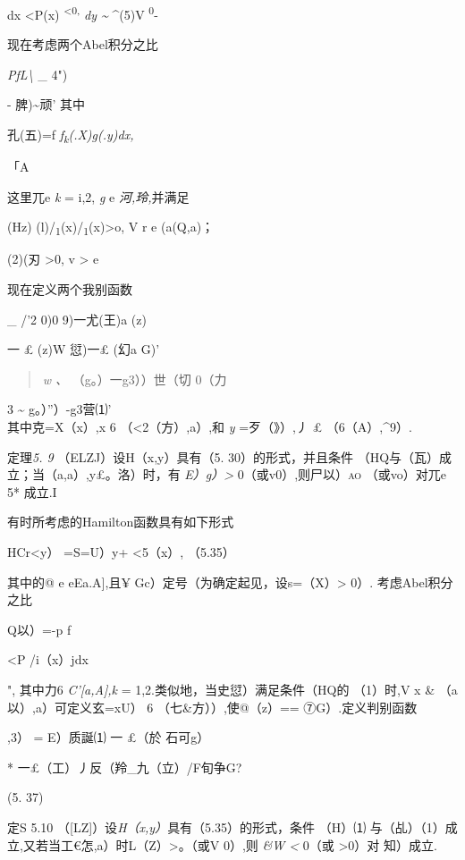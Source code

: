 \documentclass{article}
\begin{document}
dx \textless{}P(x) \textsuperscript{\textless{}0,} \emph{dy
\textasciitilde{}} \^{}(5)V \textsuperscript{0}-

现在考虑两个Abel积分之比

\emph{PfL\textbackslash{}} \_ {4")}

- 脾)\textasciitilde{}顽' 其中

孔(五)=f \emph{f\textsubscript{k}(.X)g(.y)dx,}

「A

这里兀e \emph{k} = i,2, \emph{g} e \emph{河,玲,}并满足

(Hz) (l)/\textsubscript{1}(x)/\textsubscript{1}(x)\textgreater{}o, V r e
(a(Q,a)；

(2)(刃 \textgreater{}0, v \textgreater{} e

现在定义两个我别函数

\_ {/'2 0)0 9)一尤(王)a (z)}

一 £ (z)W 愆)一£ (幻a G)'

\begin{quote}
\emph{w 、} {（g。）一g3））世（切 0（力}
\end{quote}

3 \textasciitilde{} g。）''）-g3营⑴'\\
其中克=X（x）,x 6 （\textless{}2（方）,a）,和 \emph{y} =歹（》）,丿 £
（6（A）,\^{}9）.

定理\emph{5. 9} （ELZJ）设H（x,y）具有（5. 30）的形式，并且条件
（HQ与（瓦）成立；当（a,a）,y£。洛）时，有 \emph{E）g）\textgreater{}}
0（或v0）,则尸以）\textsc{ao} （或vo）对兀e 5* 成立.I

有时所考虑的Hamilton函数具有如下形式

HCr\textless{}y） =S=U）y+ \textless{}5（x）, （5.35）

其中的@ e eEa.A{]},且¥ Gc）定号（为确定起见，设s=（X）\textgreater{}
0）. 考虑Abel积分之比

Q以）=-p f

\textless{}P /i（x）jdx

", 其中力6 \emph{C'{[}a,A{]},k} = 1,2.类似地，当史愆）满足条件（HQ的
（1）时,V x \& （a以）,a）可定义玄=xU） 6 （七\&方））,使@（z）==
⑦G）.定义判别函数

,3） = {E）质誕⑴ 一 £（於 石可g）}

* 一£（工）丿反（羚\_九（立）/F旬争G?

(5. 37)

定S 5.10 （{[}LZ{]}）设\emph{H（x,y）}具有（5.35）的形式，条件
（H\textbar{}）⑴
与（乩）（1）成立,又若当工€怎,a）时L（Z）\textgreater{}。（或V 0）,则
\emph{\&W \textless{}} 0（或 \textgreater{}0）对 知）成立.\textbar{}
\end{document}
